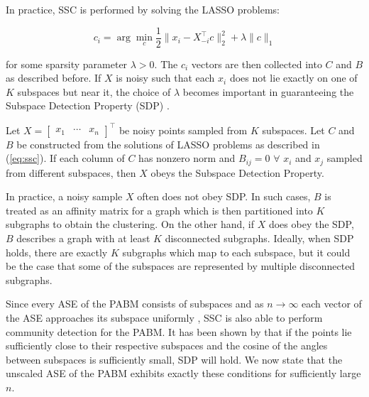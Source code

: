 \documentclass[
  11pt,
]{article}
\begin{document}
In practice, SSC is performed by solving the LASSO problems:

\begin{equation} \label{eq:ssc}
c_i = \arg\min_c \frac{1}{2} \|x_i - X_{-i}^\top c \|_2^2 + \lambda \|c\|_1
\end{equation}

for some sparsity parameter \(\lambda > 0\). The \(c_i\) vectors are
then collected into \(C\) and \(B\) as described before. If \(X\) is
noisy such that each \(x_i\) does not lie exactly on one of \(K\)
subspaces but near it, the choice of \(\lambda\) becomes important in
guaranteeing the Subspace Detection Property (SDP)
\cite{jmlr-v28-wang13}.

\begin{definition} 
Let $X = \begin{bmatrix} x_1 & \cdots & x_n \end{bmatrix}^\top$ be noisy 
points sampled from $K$ subspaces. Let $C$ and $B$ be constructed from the 
solutions of LASSO problems as described in (\ref{eq:ssc}). If each column of 
$C$ has nonzero norm and $B_{ij} = 0$ $\forall$ $x_i$ and $x_j$ sampled from 
different subspaces, then $X$ obeys the Subspace Detection Property. 
\end{definition}

\begin{remark} 
In practice, a noisy sample $X$ often does not obey SDP. 
In such cases, $B$ is treated as an affinity matrix for a graph which 
is then partitioned into $K$ subgraphs to obtain the clustering. On the other 
hand, if $X$ does obey the SDP, $B$ describes a graph 
with at least $K$ disconnected subgraphs. Ideally, when SDP holds, 
there are exactly $K$ subgraphs which map to each subspace, 
but it could be the case that some of the subspaces are represented by 
multiple disconnected subgraphs.
\end{remark}

Since every ASE of the PABM consists of subspaces and as
\(n \to \infty\) each vector of the ASE approaches its subspace
uniformly \cite{rubindelanchy2017statistical}, SSC is also able to
perform community detection for the PABM. It has been shown by
\citet{jmlr-v28-wang13} that if the points lie sufficiently close to
their respective subspaces and the cosine of the angles between
subspaces is sufficiently small, SDP will hold. We now state that the
unscaled ASE of the PABM exhibits exactly these conditions for
sufficiently large \(n\).
\end{document}
